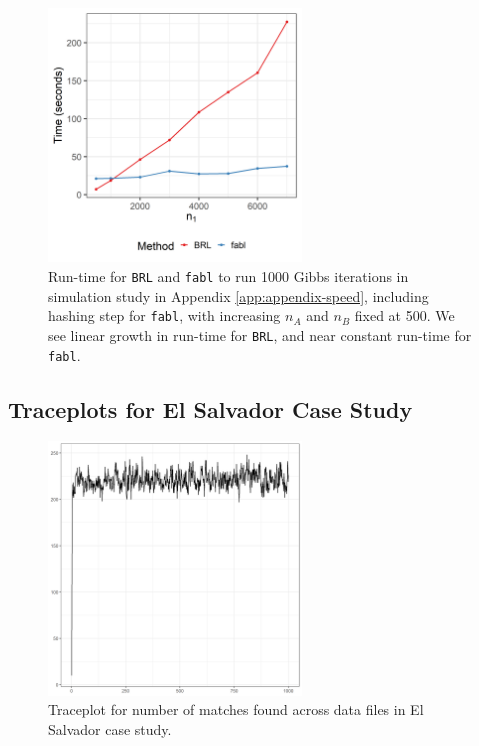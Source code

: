 \documentclass[ba]{imsart}
\begin{document}
	\begin{figure}[h!]
		\begin{center} \includegraphics[width=0.6\textwidth]{../notes/figures/speed_plot_fixed_nB_slides2} 
			\caption{Run-time for \texttt{BRL} and \texttt{fabl} to run 1000 Gibbs iterations in simulation study in Appendix \ref{app:appendix-speed}, including hashing step for \texttt{fabl}, with increasing $n_A$ and $n_B$ fixed at 500. We see linear growth in run-time for \texttt{BRL}, and near constant run-time for \texttt{fabl}.}\label{fig:app-speed2}
		\end{center}
	\end{figure}

\clearpage
	
	\hypertarget{appendix-es}{%
		\subsection{Traceplots for El Salvador Case Study}\label{app:appendix-es}}
	
	\begin{figure}[!h]
		\begin{center}
			\includegraphics[width=0.6\textwidth]{../notes/figures/el_salvador/overlap_trace} 
			\caption{Traceplot for number of matches found across data files in El Salvador case study.} \label{fig:overlap_trace}
		\end{center}
	\end{figure}
	
\end{document}

